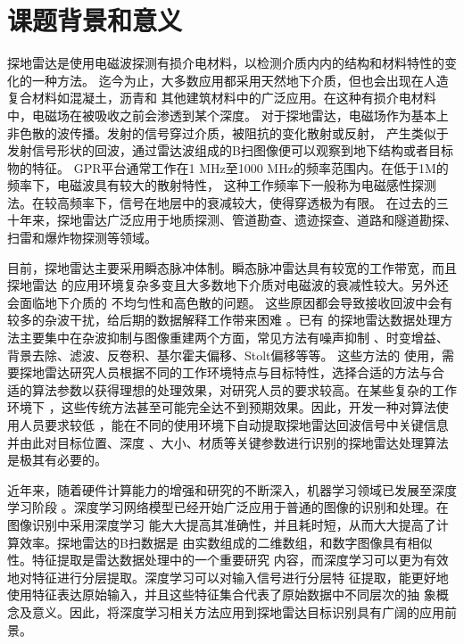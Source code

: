 \thesischapterexordium

\section{课题背景和意义}

探地雷达是使用电磁波探测有损介电材料，以检测介质内内的结构和材料特性的变化的一种方法。
迄今为止，大多数应用都采用天然地下介质，但也会出现在人造复合材料如混凝土，沥青和
其他建筑材料中的广泛应用。在这种有损介电材料中，电磁场在被吸收之前会渗透到某个深度。
对于探地雷达，电磁场作为基本上非色散的波传播。发射的信号穿过介质，被阻抗的变化散射或反射，
产生类似于发射信号形状的回波，通过雷达波组成的B扫图像便可以观察到地下结构或者目标物的特征。
GPR平台通常工作在1 MHz至1000 MHz的频率范围内。在低于1M的频率下，电磁波具有较大的散射特性，
这种工作频率下一般称为电磁感性探测法。在较高频率下，信号在地层中的衰减较大，使得穿透极为有限。
在过去的三十年来，探地雷达广泛应用于地质探测、管道勘查、遗迹探查、道路和隧道勘探、
扫雷和爆炸物探测等领域。

目前，探地雷达主要采用瞬态脉冲体制。瞬态脉冲雷达具有较宽的工作带宽，而且探地雷达
的应用环境复杂多变且大多数地下介质对电磁波的衰减性较大。另外还会面临地下介质的
不均匀性和高色散的问题。
这些原因都会导致接收回波中会有较多的杂波干扰，给后期的数据解释工作带来困难
。已有
的探地雷达数据处理方法主要集中在杂波抑制与图像重建两个方面，常见方法有噪声抑制
、时变增益、背景去除、滤波、反卷积、基尔霍夫偏移、Stolt偏移等等。
这些方法的
使用，需要探地雷达研究人员根据不同的工作环境特点与目标特性，选择合适的方法与合
适的算法参数以获得理想的处理效果，对研究人员的要求较高。在某些复杂的工作环境下
，这些传统方法甚至可能完全达不到预期效果。因此，开发一种对算法使用人员要求较低
，能在不同的使用环境下自动提取探地雷达回波信号中关键信息并由此对目标位置、深度
、大小、材质等关键参数进行识别的探地雷达处理算法是极其有必要的。

近年来，随着硬件计算能力的增强和研究的不断深入，机器学习领域已发展至深度学习阶段
。深度学习网络模型已经开始广泛应用于普通的图像的识别和处理。在图像识别中采用深度学习
能大大提高其准确性，并且耗时短，从而大大提高了计算效率。探地雷达的B扫数据是
由实数组成的二维数组，和数字图像具有相似性。特征提取是雷达数据处理中的一个重要研究
内容，而深度学习可以更为有效地对特征进行分层提取。深度学习可以对输入信号进行分层特
征提取，能更好地使用特征表达原始输入，并且这些特征集合代表了原始数据中不同层次的抽
象概念及意义。因此，将深度学习相关方法应用到探地雷达目标识别具有广阔的应用前景。

